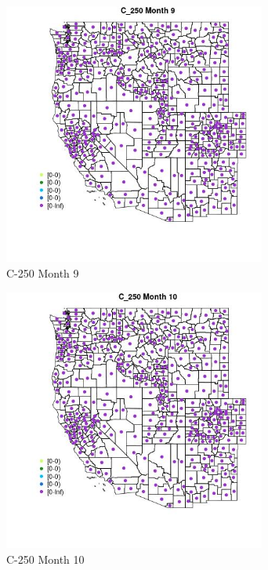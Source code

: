 \begin{figure} 
\centering  
\includegraphics[width=0.77\textwidth]{Code_Outputs/df_report_ML_predictors_CountyCentroid_Locations_Dates_2008-01-01to2018-12-31_MapObsMo9C_250.jpg} 
\caption{\label{fig:df_report_ML_predictors_CountyCentroid_Locations_Dates_2008-01-01to2018-12-31MapObsMo9C_250}C-250 Month 9} 
\end{figure} 
 

\begin{figure} 
\centering  
\includegraphics[width=0.77\textwidth]{Code_Outputs/df_report_ML_predictors_CountyCentroid_Locations_Dates_2008-01-01to2018-12-31_MapObsMo10C_250.jpg} 
\caption{\label{fig:df_report_ML_predictors_CountyCentroid_Locations_Dates_2008-01-01to2018-12-31MapObsMo10C_250}C-250 Month 10} 
\end{figure} 
 

